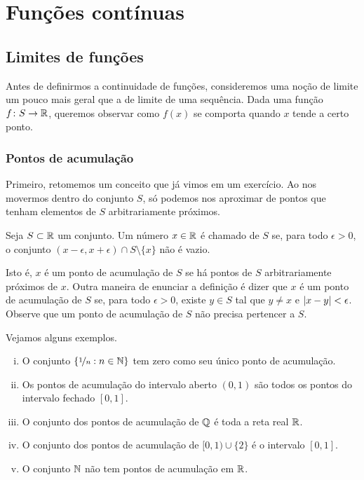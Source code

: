 \chapter{Funções contínuas} \label{lim:chapter}


\section{Limites de funções}
\label{sec:limoffunc}



Antes de definirmos a continuidade de funções, consideremos uma noção de limite
um pouco mais geral que a de limite de uma sequência.
Dada uma função $f \colon S \to
{\mathbb{R}}$, queremos observar como $f(x)$ se comporta quando $x$ tende a certo ponto.

\subsection{Pontos de acumulação}

Primeiro,
retomemos um conceito que já vimos em um exercício.
Ao nos movermos dentro do conjunto $S$, só podemos nos aproximar de pontos
que tenham elementos de $S$ arbitrariamente próximos.

\begin{defn}
Seja $S \subset {\mathbb{R}}$ um conjunto. Um número $x \in {\mathbb{R}}$ é chamado
\emph{} de $S$
se, para todo $\epsilon > 0$, o conjunto $(x-\epsilon,x+\epsilon) \cap S
\setminus \{ x \}$ não é vazio.
\end{defn}

Isto é, $x$ é um ponto de acumulação de $S$ se há pontos de $S$
arbitrariamente próximos de $x$. Outra maneira de enunciar a definição é dizer
que $x$ é um ponto de acumulação de $S$ se, para todo $\epsilon > 0$, existe
$y \in S$ tal que $y \neq x$ e $\lvert {x - y} \rvert < \epsilon$.
Observe que um ponto de acumulação de $S$ não precisa pertencer a $S$.

Vejamos alguns exemplos.
\begin{enumerate}[(i)]
\item O conjunto
$\{ \nicefrac{1}{n} : n \in {\mathbb{N}} \}$ tem zero como seu único ponto de acumulação.
\item Os pontos de acumulação do intervalo aberto $(0,1)$ são
todos os pontos do intervalo fechado $[0,1]$.
\item
O conjunto dos pontos de acumulação de ${\mathbb{Q}}$ é toda a reta real ${\mathbb{R}}$.
\item
O conjunto dos pontos de acumulação de $[0,1) \cup \{ 2 \}$ é o intervalo $[0,1]$.
\item O conjunto ${\mathbb{N}}$ não tem pontos de acumulação em ${\mathbb{R}}$.
\end{enumerate}


